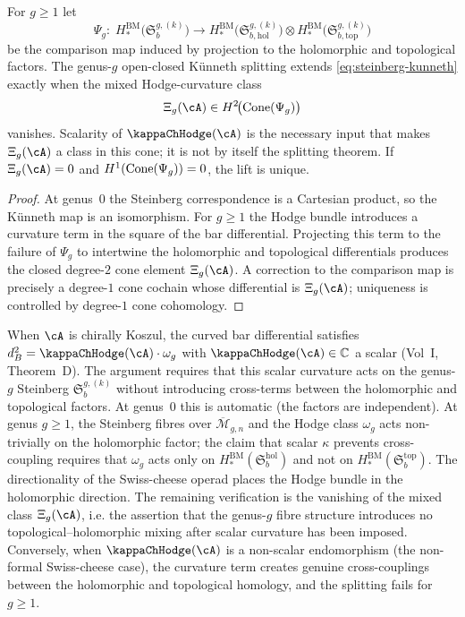 \begin{proposition}
\label{prop:kunneth-koszul-lift-criterion}
For $g\geq 1$ let
\[
\Psi_g:\;
H_*^{\mathrm{BM}}\!\bigl(\mathfrak{S}_b^{g,(k)}\bigr)
\longrightarrow
H_*^{\mathrm{BM}}\!\bigl(\mathfrak{S}_{b,\mathrm{hol}}^{g,(k)}\bigr)
\otimes
H_*^{\mathrm{BM}}\!\bigl(\mathfrak{S}_{b,\mathrm{top}}^{g,(k)}\bigr)
\]
be the comparison map induced by projection to the holomorphic and topological factors.
The genus-$g$ open-closed K\"unneth splitting extends \eqref{eq:steinberg-kunneth}
exactly when the mixed Hodge-curvature class
\[
\Xi_g(\cA)
\in
H^2\!\bigl(\Cone(\Psi_g)\bigr)
\]
vanishes. Scalarity of $\kappaChHodge(\cA)$ is the necessary input that makes
$\Xi_g(\cA)$ a class in this cone; it is not by itself the splitting theorem.
If $\Xi_g(\cA)=0$ and $H^1(\operatorname{Cone}(\Psi_g))=0$, the lift is unique.
\end{proposition}

\begin{proof}
At genus~$0$ the Steinberg correspondence is a Cartesian product, so the K\"unneth map is an
isomorphism. For $g\geq 1$ the Hodge bundle introduces a curvature term in the square of the
bar differential. Projecting this term to the failure of $\Psi_g$ to intertwine the
holomorphic and topological differentials produces the closed degree-$2$ cone element
$\Xi_g(\cA)$. A correction to the comparison map is precisely a degree-$1$ cone cochain
whose differential is $\Xi_g(\cA)$; uniqueness is controlled by degree-$1$ cone cohomology.
\end{proof}

\begin{remark}
When $\cA$ is chirally Koszul, the curved bar differential satisfies
$d_B^2 = \kappaChHodge(\cA)\cdot\omega_g$ with $\kappaChHodge(\cA) \in \C$
a scalar (Vol~I, Theorem~D).
The argument requires that this scalar curvature acts on the
genus-$g$ Steinberg $\mathfrak{S}_b^{g,(k)}$ without introducing
cross-terms between the holomorphic and topological factors.
At genus~$0$ this is automatic (the factors are independent).
At genus $g \geq 1$, the Steinberg fibres over
$\overline{\mathcal{M}}_{g,n}$ and the Hodge class $\omega_g$
acts non-trivially on the holomorphic factor; the claim that
scalar $\kappa$ prevents cross-coupling requires that $\omega_g$
acts only on $H_*^{\mathrm{BM}}(\mathfrak{S}_b^{\mathrm{hol}})$
and not on $H_*^{\mathrm{BM}}(\mathfrak{S}_b^{\mathrm{top}})$.
The directionality of the Swiss-cheese operad places the Hodge bundle in the holomorphic
direction. The remaining verification is the vanishing of the mixed class
$\Xi_g(\cA)$, i.e. the assertion that the genus-$g$ fibre structure introduces no
topological--holomorphic mixing after scalar curvature has been imposed.
Conversely, when $\kappaChHodge(\cA)$ is a non-scalar endomorphism
(the non-formal Swiss-cheese case), the curvature term creates genuine
cross-couplings between the holomorphic and topological homology,
and the splitting fails for $g \geq 1$.
\end{remark}

